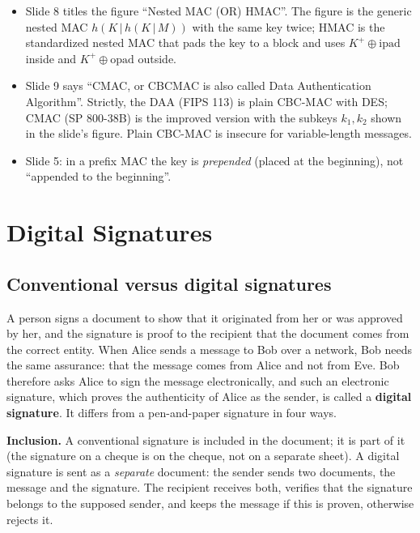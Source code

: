 \begin{fixbox}
\begin{itemize}[leftmargin=1.2em,itemsep=0pt]
  \item Slide 8 titles the figure ``Nested MAC (OR) HMAC''. The figure is the generic nested MAC $h(K \,|\, h(K \,|\, M))$ with the same key twice; HMAC is the standardized nested MAC that pads the key to a block and uses $K^+ \oplus \mathrm{ipad}$ inside and $K^+ \oplus \mathrm{opad}$ outside.
  \item Slide 9 says ``CMAC, or CBCMAC is also called Data Authentication Algorithm''. Strictly, the DAA (FIPS 113) is plain CBC-MAC with DES; CMAC (SP 800-38B) is the improved version with the subkeys $k_1, k_2$ shown in the slide's figure. Plain CBC-MAC is insecure for variable-length messages.
  \item Slide 5: in a prefix MAC the key is \emph{prepended} (placed at the beginning), not ``appended to the beginning''.
\end{itemize}
\end{fixbox}

\section{Digital Signatures}\label{sec:dsig}

\subsection{Conventional versus digital signatures \new}

A person signs a document to show that it originated from her or was approved by her, and the signature is proof to the recipient that the document comes from the correct entity. When Alice sends a message to Bob over a network, Bob needs the same assurance: that the message comes from Alice and not from Eve. Bob therefore asks Alice to sign the message electronically, and such an electronic signature, which proves the authenticity of Alice as the sender, is called a \textbf{digital signature}. It differs from a pen-and-paper signature in four ways.

\textbf{Inclusion.} A conventional signature is included in the document; it is part of it (the signature on a cheque is on the cheque, not on a separate sheet). A digital signature is sent as a \emph{separate} document: the sender sends two documents, the message and the signature. The recipient receives both, verifies that the signature belongs to the supposed sender, and keeps the message if this is proven, otherwise rejects it.

